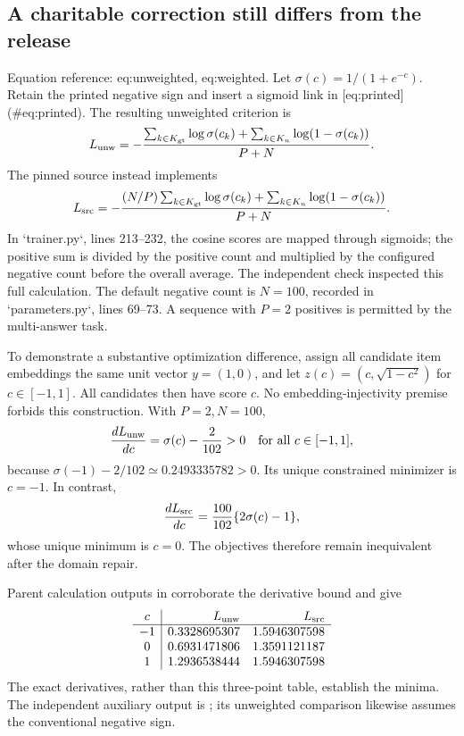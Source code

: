 \documentclass[10pt]{article}
\begin{document}
\subsection*{A charitable correction still differs from the release}
Equation reference: eq:unweighted, eq:weighted. Let \(\sigma(c)=1/(1+e^{-c})\). Retain the printed negative sign and insert a sigmoid link in [eq:printed] (\#eq:printed). The resulting unweighted criterion is \[
L_{\rm unw}=-\frac{
 \sum_{k\in K_{\rm gt}}\log\sigma(c_k)
 +\sum_{k\in K_n}\log(1-\sigma(c_k))}{P+N}.\] The pinned source instead implements \[
L_{\rm src}=-\frac{
 (N/P)\sum_{k\in K_{\rm gt}}\log\sigma(c_k)
 +\sum_{k\in K_n}\log(1-\sigma(c_k))}{P+N}.\] In `trainer.py`, lines 213–232, the cosine scores are mapped through sigmoids; the positive sum is divided by the positive count and multiplied by the configured negative count before the overall average. The independent check inspected this full calculation. The default negative count is \(N=100\), recorded in `parameters.py`, lines 69–73. A sequence with \(P=2\) positives is permitted by the multi-answer task.\par
To demonstrate a substantive optimization difference, assign all candidate item embeddings the same unit vector \(y=(1,0)\), and let \(z(c)=(c,\sqrt{1-c^2})\) for \(c\in[-1,1]\). All candidates then have score \(c\). No embedding-injectivity premise forbids this construction. With \(P=2,N=100\), \[\frac{dL_{\rm unw}}{dc}=\sigma(c)-\frac{2}{102}>0
\quad\text{for all }c\in[-1,1],\] because \(\sigma(-1)-2/102\simeq0.2493335782>0\). Its unique constrained minimizer is \(c=-1\). In contrast, \[\frac{dL_{\rm src}}{dc}
=\frac{100}{102}\{2\sigma(c)-1\},\] whose unique minimum is \(c=0\). The objectives therefore remain inequivalent after the domain repair.\par
Parent calculation outputs in corroborate the derivative bound and give \[\begin{array}{c|rr}
c& L_{\rm unw}&L_{\rm src}\\ \hline
-1&0.3328695307&1.5946307598\\
0&0.6931471806&1.3591121187\\
1&1.2936538444&1.5946307598
\end{array}\] The exact derivatives, rather than this three-point table, establish the minima. The independent auxiliary output is ; its unweighted comparison likewise assumes the conventional negative sign.\par
\end{document}
